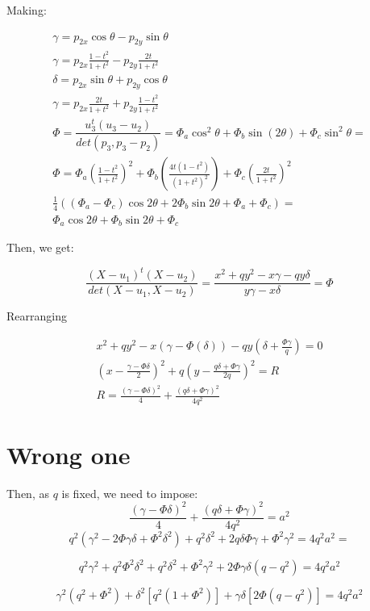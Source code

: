 \documentclass{article}
\begin{document}
Making:

\begin{eqnarray}
\gamma = p_{2x}\cos{\theta} - p_{2y}\sin{\theta}\\
\gamma = p_{2x}\frac{1-t^2}{1+t^2} - p_{2y}\frac{2t}{1+t^2}\\
\delta = p_{2x}\sin{\theta} + p_{2y}\cos{\theta}\\
\gamma = p_{2x}\frac{2t}{1+t^2} + p_{2y}\frac{1-t^2}{1+t^2}\\
\Phi=\dfrac{u_3^t(u_3-u_2)}{det(p_3, p_3-p_2)} = \Phi_a\cos^2{\theta} + \Phi_b \sin{(2\theta)} + \Phi_c \sin^2{\theta}=\\
\Phi=\Phi_a(\frac{1-t^2}{1+t^2})^2 + \Phi_b(\frac{4t(1-t^2)}{(1+t^2)^2}) + \Phi_c(\frac{2t}{1+t^2})^2\\
\frac{1}{4}((\Phi_a-\Phi_c) \cos{2\theta} + 2\Phi_b\sin{2\theta} + \Phi_a + \Phi_c)=\\
\Phi_a\cos{2\theta} + \Phi_b\sin{2\theta} + \Phi_c
\end{eqnarray}

Then, we get:

\begin{equation}
\dfrac{(X-u_1)^t(X-u_2)}{det(X-u_1, X-u_2)} = \dfrac{x^2 + qy^2 - x\gamma -qy\delta}{y\gamma - x\delta} = \Phi
\end{equation}

Rearranging

\begin{eqnarray*}
x^2 + qy^2 - x(\gamma -\Phi(\delta)) - qy(\delta + \frac{\Phi\gamma}{q}) = 0\\
(x - \frac{\gamma -\Phi\delta}{2})^2 + q(y - \frac{q\delta + \Phi\gamma}{2q})^2 = R\\
R= \frac{(\gamma - \Phi\delta)^2}{4} + \frac{(q\delta + \Phi\gamma)^2}{4q^2}
\end{eqnarray*}


\section{Wrong one}


Then, as $q$ is fixed, we need to impose:
$$ \frac{(\gamma - \Phi\delta)^2}{4} + \frac{(q\delta + \Phi\gamma)^2}{4q^2} = a^2$$
$$ q^2(\gamma^2 - 2\Phi\gamma\delta + \Phi^2\delta^2) + q^2\delta^2 + 2q\delta \Phi \gamma + \Phi^2\gamma^2 = 4q^2a^2= $$

$$
q^2\gamma^2 + q^2\Phi^2\delta^2 + q^2\delta^2 +\Phi^2\gamma^2  + 2\Phi\gamma\delta(q - q^2)= 4q^2a^2
$$

$$
\gamma^2(q^2 +\Phi^2) + \delta^2[q^2(1+\Phi^2)] + \gamma\delta[2\Phi(q-q^2)]= 4q^2a^2
$$
\end{document}
